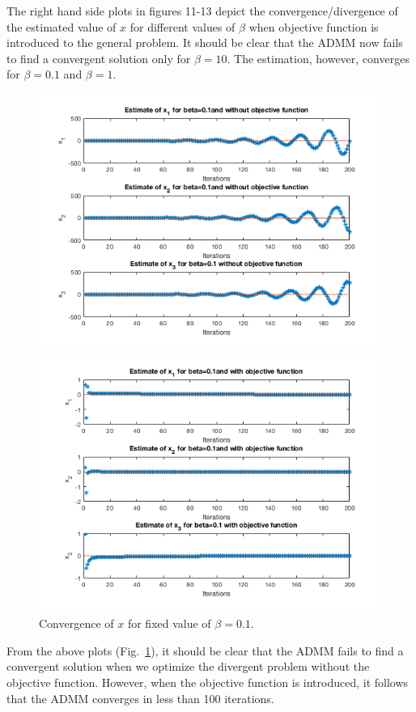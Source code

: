 \documentclass[answers]{exam}
\begin{document}
\begin{itemize}
\begin{framed}
The right hand side plots in figures 11-13 depict the convergence/divergence of the estimated value of $x$ for different values of $\beta$ when objective function is introduced to the general problem. It should be clear that the ADMM now fails to find a convergent solution only for $\beta=10$. The estimation, however, converges for $\beta=0.1$ and $\beta=1$.
\begin{figure}[H]
    \centering
    \caption{Convergence of $x$ for fixed value of $\beta=0.1$.}
    \begin{minipage}{.5\textwidth}
        \centering
        \includegraphics[width=\textwidth, height=0.45\textheight]{Problem7_1.png}
    \end{minipage}%
    \begin{minipage}{0.5\textwidth}
        \centering
        \includegraphics[width=\textwidth, height=0.45\textheight]{Problem7_2.png}
    \end{minipage}
    \label{ob01}
\end{figure}
From the above plots (Fig.~\ref{ob01}), it should be clear that the ADMM fails to find a convergent solution when we optimize the divergent problem without the objective function. However, when the objective function is introduced, it follows that the ADMM converges in less than 100 iterations. 


\end{framed}
\end{itemize}
\end{document}
